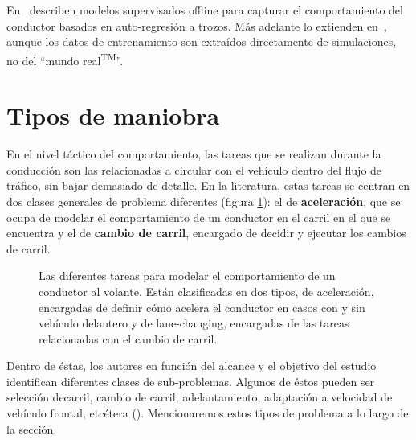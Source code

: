 En~\cite{sekizawa2007modeling} describen modelos supervisados offline para capturar el comportamiento del conductor basados en auto-regresión a trozos. Más adelante lo extienden en~\cite{terada2010multi}, aunque los datos de entrenamiento son extraídos directamente de simulaciones, no del \enquote{mundo real\textsuperscript{TM}}.

\section{Tipos de maniobra}

En el nivel táctico del comportamiento, las tareas que se realizan durante la conducción son las relacionadas a circular con el vehículo dentro del flujo de tráfico, sin bajar demasiado de detalle. En la literatura, estas tareas se centran en dos clases generales de problema diferentes (figura \ref{fig:behavior-model-classification}): el de \textbf{aceleración}, que se ocupa de modelar el comportamiento de un conductor en el carril en el que se encuentra y el de \textbf{cambio de carril}, encargado de decidir y ejecutar los cambios de carril.

\begin{figure}
	\centering
	\caption{Las diferentes tareas para modelar el comportamiento de un conductor al volante. Están clasificadas en dos tipos, de aceleración, encargadas de definir cómo acelera el conductor en casos con y sin vehículo delantero y de lane-changing, encargadas de las tareas relacionadas con el cambio de carril.}
	\label{fig:behavior-model-classification}
\end{figure}

Dentro de éstas, los autores en función del alcance y el objetivo del estudio identifican diferentes clases de sub-problemas. Algunos de éstos pueden ser selección decarril, cambio de carril, adelantamiento, adaptación a velocidad de vehículo frontal, etcétera (\cite{Aycin1999}). Mencionaremos estos tipos de problema a lo largo de la sección.

